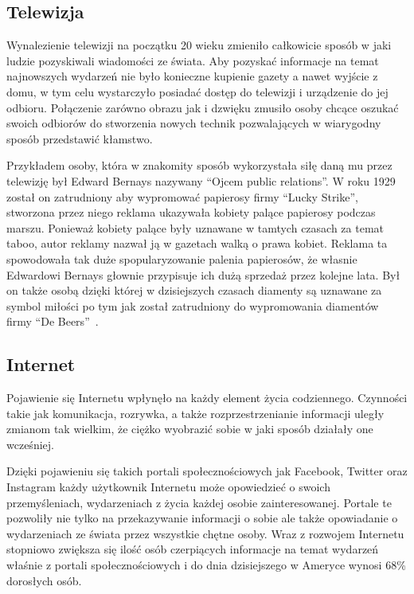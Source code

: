 \subsection{Telewizja}
Wynalezienie telewizji na początku 20 wieku zmieniło całkowicie sposób w jaki ludzie pozyskiwali wiadomości ze świata.
Aby pozyskać informacje na temat najnowszych wydarzeń nie było konieczne kupienie gazety a nawet 
wyjście z domu, w tym celu wystarczyło posiadać dostęp do telewizji i urządzenie do jej odbioru. Połączenie zarówno obrazu
jak i dzwięku zmusiło osoby chcące oszukać swoich odbiorów do stworzenia nowych technik 
pozwalających w wiarygodny sposób przedstawić kłamstwo.

Przykładem osoby, która w znakomity sposób wykorzystała siłę daną mu przez telewizję był Edward Bernays
nazywany ``Ojcem public relations''.
W roku 1929 został on zatrudniony aby wypromować papierosy firmy ``Lucky Strike'',
stworzona przez niego reklama ukazywała kobiety palące papierosy podczas marszu. 
Ponieważ kobiety palące były uznawane w tamtych czasach za temat
taboo, autor reklamy nazwał ją w gazetach walką o prawa kobiet. Reklama ta spowodowała tak duże 
spopularyzowanie palenia papierosów, że własnie Edwardowi Bernays głownie przypisuje
ich dużą sprzedaż przez kolejne lata.
Był on także osobą dzięki której w dzisiejszych czasach diamenty są uznawane za symbol miłości po tym jak
został zatrudniony do wypromowania diamentów firmy ``De Beers''~\cite{MarkDice}.

\subsection{Internet}
Pojawienie się Internetu wpłynęło na każdy element życia codziennego. Czynności takie jak komunikacja, rozrywka,
a także rozprzestrzenianie informacji uległy zmianom tak wielkim, że ciężko wyobrazić sobie w jaki sposób działały
one wcześniej. 

Dzięki pojawieniu się takich portali społecznościowych jak Facebook, Twitter oraz Instagram każdy użytkownik
Internetu może opowiedzieć o swoich przemyśleniach, wydarzeniach z życia każdej osobie zainteresowanej. Portale te
pozwoliły nie tylko na przekazywanie informacji o sobie ale także opowiadanie o wydarzeniach ze świata przez wszystkie
chętne osoby. Wraz z rozwojem Internetu stopniowo zwiększa się ilość osób czerpiących informacje na temat wydarzeń
właśnie z portali społecznościowych i do dnia dzisiejszego w Ameryce wynosi 68\% dorosłych osób. 

